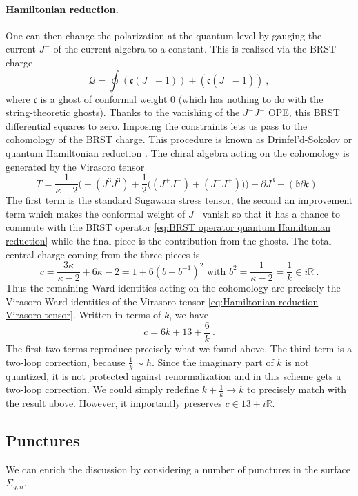 \documentclass[12pt,a4paper]{article}
\newcommand{\be}{\begin{equation}}
\newcommand{\ee}{\end{equation}}
\newcommand\RR{\mathbb{R}}
\begin{document}
\paragraph{Hamiltonian reduction.} One can then change the polarization at the quantum level by gauging the current $J^-$ of the current algebra to a constant. This is realized via the BRST charge 
\be 
 \mathcal{Q}= \oint (\mathfrak{c} (J^--1))+(\bar{\mathfrak{c}} (\bar{J}^--1))~, \label{eq:BRST operator quantum Hamiltonian reduction}
\ee
where $\mathfrak{c}$ is a ghost of conformal weight 0 (which has nothing to do with the string-theoretic ghosts). Thanks to the vanishing of the $J^- J^-$ OPE, this BRST differential squares to zero. Imposing the constraints lets us pass to the cohomology of the BRST charge. This procedure is known as Drinfel'd-Sokolov or quantum Hamiltonian reduction \cite{Drinfeld:1984qv}. The chiral algebra acting on the cohomology is generated by the Virasoro tensor 
\be 
T=\frac{1}{\kappa-2}\Big(-(J^3J^3)+\frac{1}{2}\big((J^+ J^-)+(J^- J^+)\big)\Big)- \partial J^3- (\mathfrak{b} \partial \mathfrak{c})~. \label{eq:Hamiltonian reduction Virasoro tensor}
\ee
The first term is the standard Sugawara stress tensor, the second an improvement term which makes the conformal weight of $J^-$ vanish so that it has a chance to commute with the BRST operator \eqref{eq:BRST operator quantum Hamiltonian reduction} while the final piece is the contribution from the ghosts. The total central charge coming from the three pieces is
\be 
c=\frac{3\kappa}{\kappa-2}+6\kappa-2=1+6(b+b^{-1})^2\text{ with }b^2=\frac{1}{\kappa-2}=\frac{1}{k} \in i \RR~. \label{eq:b kappa map}
\ee
Thus the remaining Ward identities acting on the cohomology are precisely the Virasoro Ward identities of the Virasoro tensor \eqref{eq:Hamiltonian reduction Virasoro tensor}. Written in terms of $k$, we have
\be 
c=6k+13+\frac{6}{k}~.
\ee
The first two terms reproduce precisely what we found above. The third term is a two-loop correction, because $\frac{1}{k} \sim \hbar$. Since the imaginary part of $k$ is not quantized, it is not protected against renormalization and in this scheme gets a two-loop correction. We could simply redefine $k+\frac{1}{k} \to k$ to precisely match with the result above. However, it importantly preserves $c \in 13+i \RR$.


\subsection{Punctures}

 We can enrich the discussion by considering a number of punctures in the surface $\Sigma_{g,n}$. 
\end{document}

